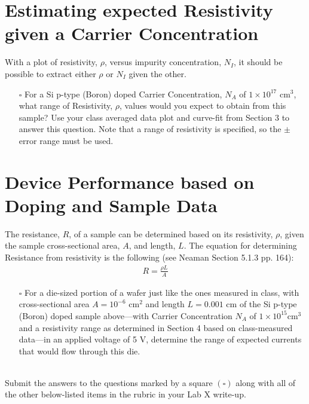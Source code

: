 \documentclass[12pt]{../manual}
\begin{document}
\newpage
\section{Estimating expected Resistivity given a Carrier Concentration}

With a plot of resistivity, $\rho$, versus impurity concentration, $N_I$, it should be possible to extract either $\rho$ or $N_I$ given the other.

\begin{itemize}
\item[$\square$] For a Si p-type (Boron) doped Carrier Concentration, $N_A$ of $1 \times 10^{17} \mbox{ cm}^3$, what range of Resistivity, $\rho$, values would you expect to obtain from this sample? Use your class averaged data plot and curve-fit from Section 3 to answer this question. Note that a range of resistivity is specified, so the $\pm$ error range must be used.
\end{itemize}

\section{Device Performance based on Doping and Sample Data}

The resistance, $R$, of a sample can be determined based on its resistivity, $\rho$, given the sample cross-sectional area, $A$, and length, $L$. The equation for determining Resistance from resistivity is the following (see Neaman Section 5.1.3 pp. 164):
\begin{align}
R = \frac{\rho L}{A}
\end{align}

\begin{itemize}
\item[$\square$] For a die-sized portion of a wafer just like the ones measured in class, with cross-sectional area $A = 10^{-6} \mbox{ cm}^2$ and length $L = 0.001$ cm of the Si p-type (Boron) doped sample above---with Carrier Concentration $N_A$ of $1 \times 10^{15} \mbox{cm}^3$ and a resistivity range as determined in Section 4 based on class-measured data---in an applied voltage of 5 V, determine the range of expected currents that would flow through this die.
\end{itemize}

~\\Submit the answers to the questions marked by a square $(\square)$ along with all of the other below-listed items in the rubric in your Lab X write-up. 
\end{document}
